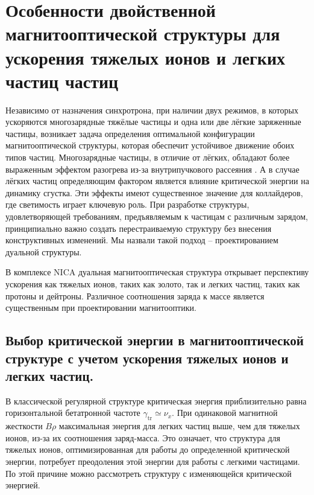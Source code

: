 
	\chapter{Особенности двойственной магнитооптической структуры для ускорения тяжелых ионов и легких частиц частиц}\label{ch:dual}

\par Независимо от назначения синхротрона, при наличии двух режимов, в которых ускоряются многозарядные тяжёлые частицы и одна или две лёгкие заряженные частицы, возникает задача определения оптимальной конфигурации магнитооптической структуры, которая обеспечит устойчивое движение обоих типов частиц. Многозарядные частицы, в отличие от лёгких, обладают более выраженным эффектом разогрева из-за внутрипучкового рассеяния \cite{trubnikov:cool}. А в случае лёгких частиц определяющим фактором является влияние критической энергии на динамику сгустка. Эти эффекты имеют существенное значение для коллайдеров, где светимость играет ключевую роль. При разработке структуры, удовлетворяющей требованиям, предъявляемым к частицам с различным зарядом, принципиально важно создать перестраиваемую структуру без внесения конструктивных изменений. Мы назвали такой подход -- проектированием дуальной структуры.

\par В комплексе NICA дуальная магнитооптическая структура открывает перспективу ускорения как тяжелых ионов, таких как золото, так и легких частиц, таких как протоны и дейтроны. Различное соотношения заряда к массе является существенным при проектировании магнитооптики.

	\section{Выбор критической энергии в магнитооптической структуре с учетом ускорения тяжелых ионов и легких частиц.}\label{sec:ch:ions_light/transition}

\par В классической регулярной структуре критическая энергия приблизительно равна горизонтальной бетатронной частоте $\gamma_{\text{tr}}\simeq\nu_{x}$. При одинаковой магнитной жесткости $B\rho$ максимальная энергия для легких частиц выше, чем для тяжелых ионов, из-за их соотношения заряд-масса. Это означает, что структура для тяжелых ионов, оптимизированная для работы до определенной критической энергии, потребует преодоления этой энергии для работы с легкими частицами. По этой причине можно рассмотреть структуру с изменяющейся критической энергией.

